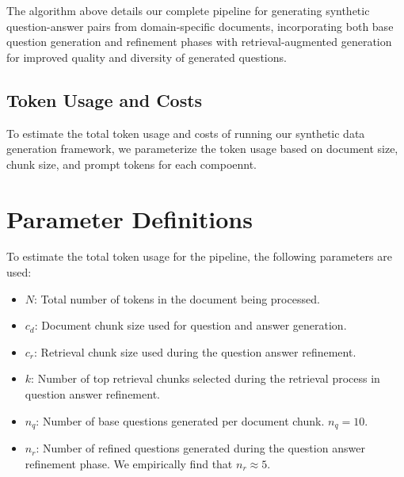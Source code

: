 The algorithm above details our complete pipeline for generating synthetic question-answer pairs 
from domain-specific documents, incorporating both base question generation and refinement phases
with retrieval-augmented generation for improved quality and diversity of generated questions.


\subsection{Token Usage and Costs}

To estimate the total token usage and costs of running our synthetic data generation framework, 
we parameterize the token usage based on document size, chunk size, and prompt tokens for each compoennt. 

\section*{Parameter Definitions}

To estimate the total token usage for the pipeline, the following parameters are used:

\begin{itemize}
    \item \( N \): Total number of tokens in the document being processed.
    \item \( c_d \): Document chunk size used for question and answer generation.
    \item \( c_r \): Retrieval chunk size used during the question answer refinement. 
    \item \( k \): Number of top retrieval chunks selected during the retrieval process in question answer refinement. 
    \item \( n_q \): Number of base questions generated per document chunk. \( n_q = 10 \).
    \item \( n_r \): Number of refined questions generated during the question answer refinement phase. We empirically find that  \( n_r  \approx  5 \).

\end{itemize}

